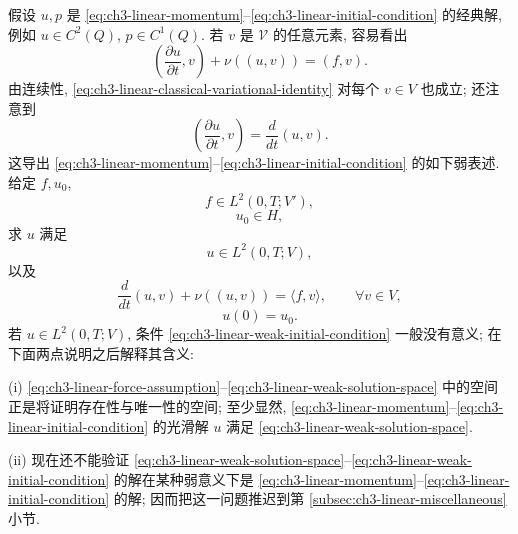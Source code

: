 假设 $u,p$ 是 \eqref{eq:ch3-linear-momentum}--\eqref{eq:ch3-linear-initial-condition} 的经典解, 例如 $u\in C^2(Q)$, $p\in C^1(Q)$. 若 $v$ 是 $\mathcal V$ 的任意元素, 容易看出
\begin{equation}
\left(\frac{\partial u}{\partial t},v\right)+\nu((u,v))=(f,v).
\label{eq:ch3-linear-classical-variational-identity}
\end{equation}
由连续性, \eqref{eq:ch3-linear-classical-variational-identity} 对每个 $v\in V$ 也成立; 还注意到
\[
\left(\frac{\partial u}{\partial t},v\right)=\frac d{dt}(u,v).
\]
这导出 \eqref{eq:ch3-linear-momentum}--\eqref{eq:ch3-linear-initial-condition} 的如下弱表述. 给定 $f,u_0$,
\begin{equation}
f\in L^2(0,T;V'),
\label{eq:ch3-linear-force-assumption}
\end{equation}
\begin{equation}
u_0\in H,
\label{eq:ch3-linear-initial-data-assumption}
\end{equation}
求 $u$ 满足
\begin{equation}
u\in L^2(0,T;V),
\label{eq:ch3-linear-weak-solution-space}
\end{equation}
以及
\begin{equation}
\frac d{dt}(u,v)+\nu((u,v))=\langle f,v\rangle,
\qquad\forall v\in V,
\label{eq:ch3-linear-weak-variational-equation}
\end{equation}
\begin{equation}
u(0)=u_0.
\label{eq:ch3-linear-weak-initial-condition}
\end{equation}
若 $u\in L^2(0,T;V)$, 条件 \eqref{eq:ch3-linear-weak-initial-condition} 一般没有意义; 在下面两点说明之后解释其含义:

(i) \eqref{eq:ch3-linear-force-assumption}--\eqref{eq:ch3-linear-weak-solution-space} 中的空间正是将证明存在性与唯一性的空间; 至少显然, \eqref{eq:ch3-linear-momentum}--\eqref{eq:ch3-linear-initial-condition} 的光滑解 $u$ 满足 \eqref{eq:ch3-linear-weak-solution-space}.

\hypertarget{chapter-03-page-187}{}
(ii) 现在还不能验证 \eqref{eq:ch3-linear-weak-solution-space}--\eqref{eq:ch3-linear-weak-initial-condition} 的解在某种弱意义下是 \eqref{eq:ch3-linear-momentum}--\eqref{eq:ch3-linear-initial-condition} 的解; 因而把这一问题推迟到第 \ref{subsec:ch3-linear-miscellaneous} 小节.

